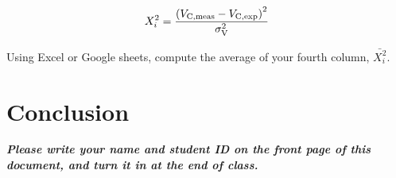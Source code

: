 \documentclass[12pt]{article}
\begin{document}
\begin{equation}
X_i^2 = \frac{\left(V_{\rm C,meas} - V_{\rm C,exp}\right)^2}{\sigma_{\rm V}^2}
\end{equation}

Using Excel or Google sheets, compute the average of your fourth column, $\bar{X_i^2}$.

\section{Conclusion}

\textit{\textbf{Please write your name and student ID on the front page of this document, and turn it in at the end of class.}}
\end{document}

